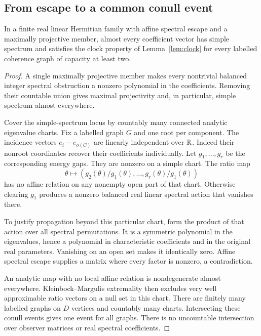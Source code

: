 \subsection{From escape to a common conull event}

\begin{lemma}\label{lem:extremality}
In a finite real linear Hermitian family with affine spectral escape
and a maximally projective member, almost every coefficient vector
has simple spectrum and satisfies the clock property of
Lemma~\ref{lem:clock} for every labelled coherence graph of capacity
at least two.
\end{lemma}

\begin{proof}
A single maximally projective member makes every nontrivial balanced
integer spectral obstruction a nonzero polynomial in the
coefficients. Removing their countable union gives maximal
projectivity and, in particular, simple spectrum almost everywhere.

Cover the simple-spectrum locus by countably many connected analytic
eigenvalue charts. Fix a labelled graph $G$ and one root per component.
The incidence vectors $e_i-e_{o(C)}$ are linearly independent over
$\mathbb R$. Indeed their nonroot coordinates recover their coefficients
individually. Let $g_1,\ldots,g_r$ be the corresponding energy gaps.
They are nonzero on a simple chart. The ratio map
\[
 \theta\longmapsto
 (g_2(\theta)/g_1(\theta),\ldots,g_r(\theta)/g_1(\theta))
\]
has no affine relation on any nonempty open part of that chart.
Otherwise clearing $g_1$ produces a nonzero balanced real linear
spectral action that vanishes there.

To justify propagation beyond this particular chart, form the product
of that action over all spectral permutations. It is a symmetric
polynomial in the eigenvalues, hence a polynomial in characteristic
coefficients and in the original real parameters. Vanishing on an
open set makes it identically zero. Affine spectral escape supplies
a matrix where every factor is nonzero, a contradiction.

An analytic map with no local affine relation is nondegenerate
almost everywhere. Kleinbock--Margulis extremality then excludes
very well approximable ratio vectors on a null set in this chart.
There are finitely many labelled graphs on $D$ vertices and
countably many charts. Intersecting these conull events gives one
event for all graphs. There is no uncountable intersection over
observer matrices or real spectral coefficients.
\end{proof}

